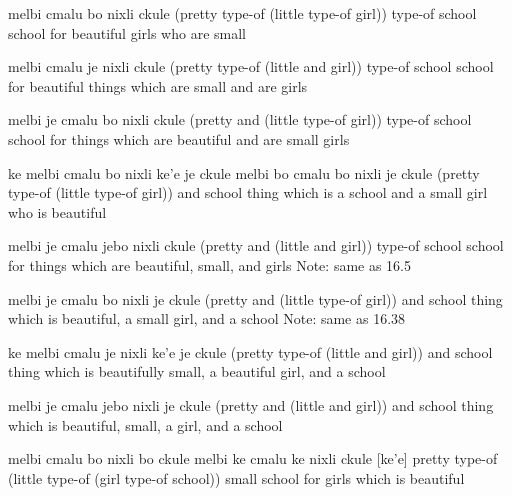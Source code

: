 \begin{example}
melbi cmalu bo nixli ckule\n
(pretty type-of (little type-of girl)) type-of school\n
school for beautiful girls who are small
\end{example}

\begin{example}
melbi cmalu je nixli ckule\n
(pretty type-of (little and girl)) type-of school\n
school for beautiful things which are small and are girls
\end{example}

\begin{example}
melbi je cmalu bo nixli ckule\n
(pretty and (little type-of girl)) type-of school\n
school for things which are beautiful and are small girls
\end{example}

\begin{example}
ke melbi cmalu bo nixli ke'e je ckule\n
melbi bo cmalu bo nixli je ckule\n
(pretty type-of (little type-of girl)) and school\n
thing which is a school and a small girl who is beautiful
\end{example}

\begin{example}
melbi je cmalu jebo nixli ckule\n
(pretty and (little and girl)) type-of school\n
school for things which are beautiful, small, and girls\n
Note: same as 16.5
\end{example}

\begin{example}
melbi je cmalu bo nixli je ckule\n
(pretty and (little type-of girl)) and school\n
thing which is beautiful, a small girl, and a school\n
Note: same as 16.38
\end{example}

\begin{example}
ke melbi cmalu je nixli ke'e je ckule\n
(pretty type-of (little and girl)) and school\n
thing which is beautifully small, a beautiful girl,\n
\T	and a school
\end{example}

\begin{example}
melbi je cmalu jebo nixli je ckule\n
(pretty and (little and girl)) and school\n
thing which is beautiful, small, a girl, and a school
\end{example}

\begin{example}
melbi cmalu bo nixli bo ckule\n
melbi ke cmalu ke nixli ckule  [ke'e]\n
pretty type-of (little type-of (girl type-of school))\n
small school for girls which is beautiful
\end{example}

